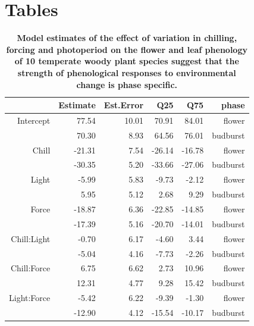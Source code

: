\documentclass[11pt]{article}
\begin{document}
\section*{Tables}
\begin{table}[ht]
\centering
\begin{tabular}{|r|r|r|r|r|r|}
  \hline
 & Estimate & Est.Error & Q25 & Q75 & phase \\ 
  \hline
Intercept & 77.54 & 10.01 & 70.91 & 84.01 & flower \\ 
 & 70.30 & 8.93 & 64.56 & 76.01 & budburst \\ 
  \hline
  Chill & -21.31 & 7.54 & -26.14 & -16.78 & flower\\ 
   & -30.35 & 5.20 & -33.66 & -27.06 & budburst\\ 
 \hline
  Light & -5.99 & 5.83 & -9.73 & -2.12 & flower\\ 
   & 5.95 & 5.12 & 2.68 & 9.29 & budburst\\ 
  \hline
  Force & -18.87 & 6.36 & -22.85 & -14.85 & flower\\ 
 & -17.39 & 5.16 & -20.70 & -14.01 & budburst \\ 
  \hline
  Chill:Light & -0.70 & 6.17 & -4.60 & 3.44 & flower\\ 
     & -5.04 & 4.16 & -7.73 & -2.26 & budburst\\ 
  \hline
  Chill:Force & 6.75 & 6.62 & 2.73 & 10.96 & flower \\ 
   & 12.31 & 4.77 & 9.28 & 15.42 & budburst \\ 
  \hline
  Light:Force & -5.42 & 6.22 & -9.39 & -1.30 & flower \\ 
    & -12.90 & 4.12 & -15.54 & -10.17 & budburst\\ 
   \hline
\end{tabular}
\label{tab:modelests}
\caption{\textbf{Model estimates of the effect of variation in chilling, forcing and photoperiod on the flower and leaf phenology of 10 temperate woody plant species suggest that the strength of phenological responses to environmental change is phase specific.}}
\end{table}
\end{document}
